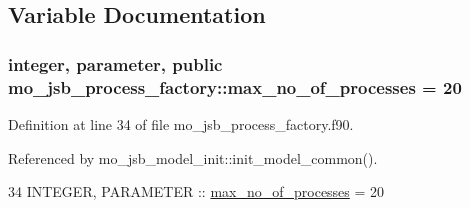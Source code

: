 \subsection{Variable Documentation}
\hypertarget{namespacemo__jsb__process__factory_a337f3a29d18cd060186cd10e4b2a878e}{}
\subsubsection[{max\+\_\+no\+\_\+of\+\_\+processes}]{\setlength{\rightskip}{0pt plus 5cm}integer, parameter, public mo\+\_\+jsb\+\_\+process\+\_\+factory\+::max\+\_\+no\+\_\+of\+\_\+processes = 20}\label{namespacemo__jsb__process__factory_a337f3a29d18cd060186cd10e4b2a878e}


Definition at line 34 of file mo\+\_\+jsb\+\_\+process\+\_\+factory.\+f90.



Referenced by mo\+\_\+jsb\+\_\+model\+\_\+init\+::init\+\_\+model\+\_\+common().


\begin{DoxyCode}
34   \textcolor{keywordtype}{INTEGER}, \textcolor{keywordtype}{PARAMETER} :: \hyperlink{namespacemo__jsb__process__factory_a337f3a29d18cd060186cd10e4b2a878e}{max\_no\_of\_processes} = 20
\end{DoxyCode}
